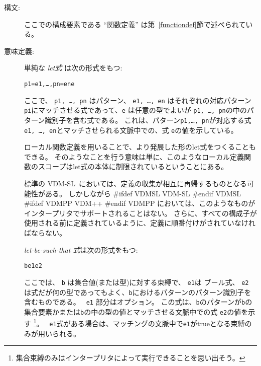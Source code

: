 \documentclass[\pformat,12pt]{jarticle}
\newcommand{\vdmslpp}[2]{%
#ifdef VDMSL
#1
#endif VDMSL
#ifdef VDMPP
#2
#endif VDMPP
}
\newcommand{\vdmsl}{VDM-SL}
\newcommand{\vdmpp}{VDM++}
\begin{document}
\begin{description}
\item[構文:]





  \noindent ここでの構成要素である ``関数定義'' は第~\ref{functiondef}節で述べられている。

\item[意味定義:] 単純な {\it let式} は次の形式をもつ:
  \begin{alltt}
     p1 = e1, \ldots, pn = en  e
  \end{alltt}
ここで、 {\tt p1, \ldots, pn} はパターン、 {\tt e1, \ldots, en} はそれぞれの対応パターン {\tt pi}にマッチさせる式であって、{\tt e} は任意の型でよいが {\tt p1, \ldots, pn}の中のパターン識別子を含む式である。 
これは、パターン{\tt p1,\ldots, pn}が対応する式{\tt e1, \ldots, en}とマッチさせられる文脈中での、式 {\tt e}の値を示している。 

 ローカル関数定義を用いることで、より発展した形のlet式をつくることもできる。
そのようなことを行う意味は単に、このようなローカル定義関数のスコープはlet式の本体に制限されているということにある。

標準の \vdmsl\ においては、定義の収集が相互に再帰するものとなる可能性がある。
しかしながら\vdmslpp{\vdmsl}{\vdmpp}においては、このようなものがインタープリタでサポートされることはない。 
さらに、すべての構成子が使用される前に定義されているように、定義に順番付けがされていなければならない。
     
   {\it let-be-such-that 式}は次の形式をもつ:
  \begin{alltt}
     b  e1  e2
  \end{alltt}%
ここでは、 {\tt b} は集合値(または型)に対する束縛で、 {\tt e1}は ブール式、 {\tt e2} は式だが何の型であってもよく、{\tt b}におけるパターンのパターン識別子を含むものである。
 {\tt {} e1} 部分はオプション。
この式は、{\tt b}のパターンが{\tt b}の集合要素かまたは{\tt b}の中の型の値とマッチさせる文脈中での式 {\tt e2}の値を示す
  \footnote{集合束縛のみはインタープリタによって実行できることを思い出そう。}。 {\tt {} e1}式がある場合は、マッチングの文脈中で{\tt e1}がtrueとなる束縛のみが用いられる。


\end{description}
\end{document}
